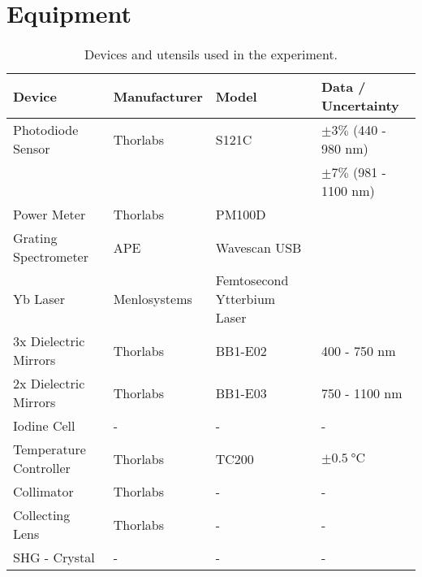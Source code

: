 \section{Equipment}
\label{sec:equipment}
\begin{table}[H]
	\centering
	\caption{
		Devices and utensils used in the experiment.
		}
	\begin{tabular}[h]{| l | l | l | l |}
		\hline
		Device     & Manufacturer   & Model  & Data / Uncertainty       \\\hline
		\hline
		Photodiode Sensor & Thorlabs & S121C & $\pm 3\%$ (440 - 980 nm) \\
	                      &          &       & $\pm 7\%$ (981 - 1100 nm) \cite{Photosensor} \\ \hline
		Power Meter & Thorlabs & PM100D & \cite{Power} \\ \hline
		Grating Spectrometer & APE & Wavescan USB &  \cite{Speck} \\ \hline
		Yb Laser & Menlosystems & Femtosecond Ytterbium Laser & \cite{Laser} \\ \hline
		3x Dielectric Mirrors & Thorlabs & BB1-E02 & 400 - 750 nm \\ \hline
		2x Dielectric Mirrors & Thorlabs & BB1-E03 & 750 - 1100 nm \\ \hline
		Iodine Cell & - & - & - \\ \hline
 		Temperature Controller & Thorlabs & TC200 & $\pm \SI{0.5}{\celsius}$ \cite{TempC} \\ \hline
		Collimator &Thorlabs & - &- \\ \hline 
		Collecting Lens & Thorlabs & -& - \\ \hline
		SHG - Crystal & - & - & - \\ \hline
	\end{tabular}
	\label{tab:equipment}
\end{table}
\newpage